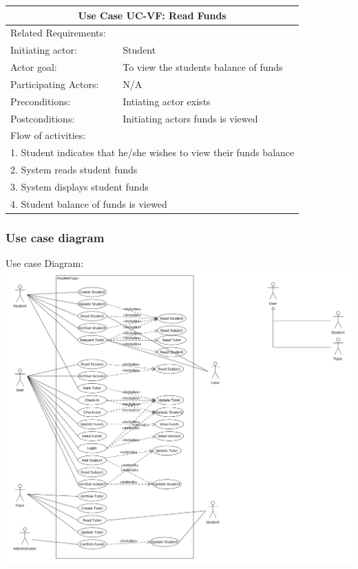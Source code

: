 \documentclass[12pt]{article}
\begin{document}
{		\begin{tabular}{| l | p{10cm}| }
      \hline\multicolumn{2}{|c|}{ \textbf{Use Case UC-VF: Read Funds} }\\ \hline
      Related Requirements: &\\ \hline
      Initiating actor: & Student\\ \hline
      Actor goal: &To view the students balance of funds\\ \hline
      Participating Actors: &N/A\\ \hline
      Preconditions: &Intiating actor exists\\ \hline
      Postconditions: &Initiating actors funds is viewed \\ \hline
      \multicolumn{2}{|l|}{Flow of activities:}\\ \hline
      \multicolumn{2}{|p{15cm}|}{1. Student indicates that he/she wishes to view their funds balance}\\
      \multicolumn{2}{|p{15cm}|}{2. System reads student funds}\\
      \multicolumn{2}{|l|}{3. System displays student funds}\\
      \multicolumn{2}{|l|}{4. Student balance of funds is viewed}\\
       \hline
    \end{tabular}

	\newpage
\subsubsection{Use case diagram}
Use case Diagram:
		\centering
		\includegraphics[width=140mm]{./Sprint3Models/Use_Case_Diagram.png}


}
\end{document}
